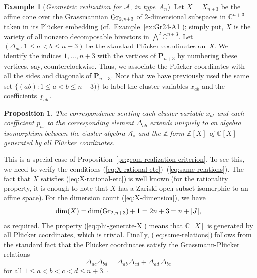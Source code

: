 \documentclass[letterpaper]{amsart}
\numberwithin{equation}{section}
\newtheorem{proposition}[theorem]{Proposition}
\theoremstyle{definition}
\newtheorem{example}[theorem]{Example}
\def\proof{\smallskip\noindent {\bf Proof.\ }}
\def\endproof{\hfill$\square$\medskip}
\def\AA{\mathcal{A}}
\def\ZZ{\mathbb{Z}}
\def\CC{\mathbb{C}}
\def\Poly{\mathbf{P}}
\begin{document}
\begin{example} 
[\emph{Geometric realization for $\AA_\circ$ in type~$A_n$}] 
\label{ex:realization-An} 
Let $X = X_{n+3}$ 
be the affine cone over the Grassmannian ${\rm Gr}_{2,n+3}$ 
of 2-dimensional subspaces in $\CC^{n+3}$ 
taken in its Pl\"ucker embedding (cf.~Example~\ref{ex:Gr24-A1}); 
simply put, $X$ is the variety of all nonzero decomposable 
bivectors in $\bigwedge^2 \CC^{n+3}$. 
Let $(\Delta_{ab}: 1 \leq a < b \leq n+3)$ be the standard Pl\"ucker 
coordinates on~$X$. 
We identify the indices $1, \dots, n+3$ with the vertices of 
$\Poly_{n+3}$ by numbering these vertices, say, counterclockwise. 
Thus, we associate the Pl\"ucker coordinates with all the sides and 
diagonals of $\Poly_{n+3}$. 
Note that we have previously used the same set 
$\{(ab): 1 \leq a < b \leq n+3)\}$ to label the 
cluster variables $x_{ab}$ and the coefficients~$p_{ab}\,$. 
\end{example} 
 
\begin{proposition} 
\label{pr:geom-realization-An} 
The correspondence sending each cluster variable $x_{ab}$ 
and each coefficient $p_{ab}$ to the corresponding element $\Delta_{ab}$ 
extends uniquely to an algebra isomorphism between the cluster algebra $\AA_\circ$ 
and the $\ZZ$-form $\ZZ[X]$ of $\CC[X]$ generated by all Pl\"ucker 
coordinates. 
\end{proposition} 
 
\proof 
This is a special case of Proposition~\ref{pr:geom-realization-criterion}. 
To see this, we need to verify the conditions 
(\ref{eq:X-rational-etc})--(\ref{eq:same-relations}). 
The fact that $X$ satisfies (\ref{eq:X-rational-etc}) is well 
known (for the rationality property, it is enough to note that 
$X$ has a Zariski open subset isomorphic to an affine space). 
For the dimension count (\ref{eq:X-dimension}), we have 
$$\dim (X) = \dim ({\rm Gr}_{2,n+3}) + 1 = 2n+3 = n + |J|,$$ 
as required. 
The property (\ref{eq:phi-generate-X}) means that 
$\CC[X]$ is generated by all Pl\"ucker coordinates, which is 
trivial. 
Finally, (\ref{eq:same-relations}) follows from the standard fact that 
the Pl\"ucker coordinates satisfy the Grassmann-Pl\"ucker relations 
\[ 
\Delta_{ac} \Delta_{bd} = \Delta_{ab}\, \Delta_{cd} + 
\Delta_{ad}\, \Delta_{bc} 
\] 
for all $1 \leq a < b < c < d \leq n+3$. 
\endproof 
 
\end{document}
